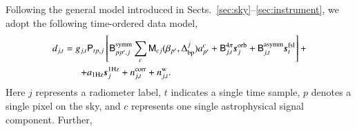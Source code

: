 \documentclass[twocolumn]{aa}
\newcommand{\s}[0]{\vec{s}}
\newcommand{\B}[0]{\tens{B}}
\newcommand{\M}[0]{\tens{M}}
\renewcommand{\P}[0]{\tens{P}}
\newcommand{\Dbp}[0]{\Delta_{\mathrm{bp}}}
\begin{document}
Following the general model introduced in
Sects.~\ref{sec:sky}--\ref{sec:instrument}, we adopt the following
time-ordered data model,
\begin{equation}
  \begin{split}
    d_{j,t} = g_{j,t}&\P_{tp,j}\left[\B^{\mathrm{symm}}_{pp',j}\sum_{c}
      \M_{cj}(\beta_{p'}, \Dbp^{j})a^c_{p'}  + \B^{4\pi}_{j,t}\s^{\mathrm{orb}}_{j}  
      + \B^{\mathrm{asymm}}_{j,t} \s^{\mathrm{fsl}}_{t} \right]
    +   \label{eq:todmodel} \\
    + &a_{\mathrm{1Hz}}\s^{\mathrm{1Hz}}_{j} + n^{\mathrm{corr}}_{j,t} + n^{\mathrm{w}}_{j,t}.
  \end{split}
\end{equation}
Here $j$ represents a radiometer label, $t$ indicates a single
time sample, $p$ denotes a single pixel on the sky, and $c$ represents
one single astrophysical signal component. Further,
\end{document}
